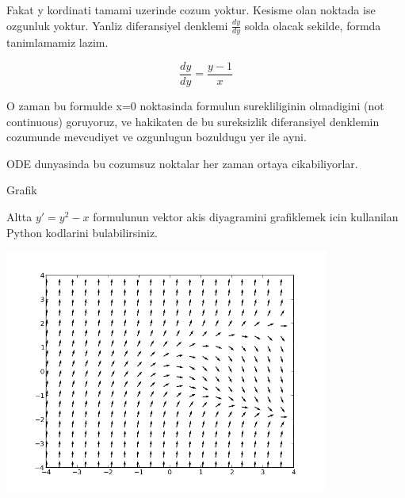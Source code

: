 \documentclass[12pt,fleqn]{article}\usepackage{../common}
\begin{document}
Fakat y kordinati tamami uzerinde cozum yoktur. Kesisme olan noktada ise
ozgunluk yoktur. Yanliz diferansiyel denklemi $\frac{dy}{dy}$ solda olacak
sekilde, formda tanimlamamiz lazim. 

\[ \frac{dy}{dy} = \frac{y-1}{x} \]

O zaman bu formulde x=0 noktasinda formulun surekliliginin olmadigini (not
continuous) goruyoruz, ve hakikaten de bu sureksizlik diferansiyel denklemin
cozumunde mevcudiyet ve ozgunlugun bozuldugu yer ile ayni. 

ODE dunyasinda bu cozumsuz noktalar her zaman ortaya cikabiliyorlar. 

Grafik

Altta $y' = y^2-x$ formulunun vektor akis diyagramini grafiklemek icin
kullanilan Python kodlarini bulabilirsiniz.



\includegraphics[height=8cm]{isoclines.png}
\end{document}
